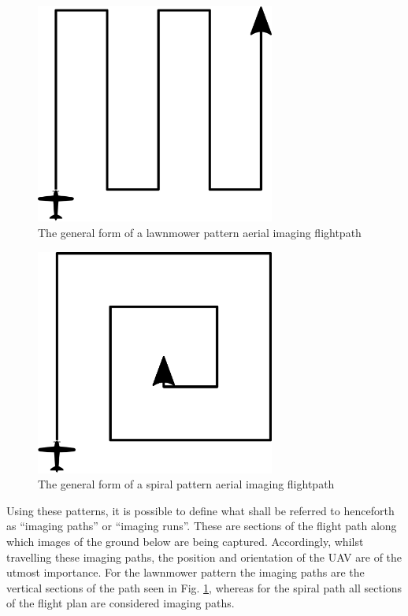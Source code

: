 \begin{figure}[htbp!] 
\centering    
\includegraphics[width=0.7\textwidth]{SimpleLawnmower}
\caption[A simple lawnmower pattern flightpath]{The general form of a lawnmower pattern aerial imaging flightpath}
\label{fig:simplelawnmower}
\end{figure}

\begin{figure}[htbp!] 
\centering    
\includegraphics[width=0.7\textwidth]{SimpleSpiral}
\caption[A simple spiral pattern flightpath]{The general form of a spiral pattern aerial imaging flightpath}
\label{fig:simplespiral}
\end{figure}

Using these patterns, it is possible to define what shall be referred to henceforth as ``imaging paths'' or ``imaging runs''. These are sections of the flight path along which images of the ground below are being captured. Accordingly, whilst travelling these imaging paths, the position and orientation of the UAV are of the utmost importance. For the lawnmower pattern the imaging paths are the vertical sections of the path seen in Fig. \ref{fig:simplelawnmower}, whereas for the spiral path all sections of the flight plan are considered imaging paths. 

